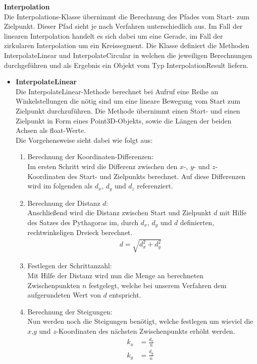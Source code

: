 \textbf{Interpolation}\\
Die Interpolations-Klasse übernimmt die Berechnung des Pfades vom Start- zum Zielpunkt. Dieser Pfad sieht je nach Verfahren unterschiedlich aus. Im Fall der linearen Interpolation handelt es sich dabei um eine Gerade, im Fall der zirkularen Interpolation um ein Kreissegment. Die Klasse definiert die Methoden InterpolateLinear und InterpolateCircular in welchen die jeweiligen Berechnungen durchgeführen und als Ergebnis ein Objekt vom Typ InterpolationResult liefern.
\begin{itemize}
\item \textbf{InterpolateLinear}\\
Die InterpolateLinear-Methode berechnet bei Aufruf eine Reihe an Winkelstellungen die nötig sind um eine lineare Bewegung vom Start zum Zielpunkt durchzuführen. Die Methode übernimmt einen Start- und einen Zielpunkt in Form eines Point3D-Objekts, sowie die Längen der beiden Achsen als float-Werte.\\
Die Vorgehensweise sieht dabei wie folgt aus:
\begin{enumerate}
\item Berechnung der Koordinaten-Differenzen:\\
Im ersten Schritt wird die Differenz zwischen den $x$-, $y$- und $z$-Koordinaten des Start- und Zielpunkts berechnet. Auf diese Differenzen wird im folgenden als $d_x$, $d_y$ und $d_z$ referenziert. 
\item Berechnung der Distanz $d$:\\
Anschließend wird die Distanz zwischen Start und Zielpunkt $d$ mit Hilfe des Satzes des Pythagoras im, durch $d_x$, $d_y$ und $d$ definierten, rechtwinkeligen Dreieck berechnet.
\begin{align*}
d = \sqrt{d_x^2+d_y^2}
\end{align*}
\item Festlegen der Schrittanzahl:\\
Mit Hilfe der Distanz wird nun die Menge an berechneten Zwischenpunkten $n$ festgelegt, welche bei unserem Verfahren dem aufgerundeten Wert von $d$ entspricht.
\item Berechnung der Steigungen:\\
Nun werden noch die Steigungen benötigt, welche festlegen um wieviel die $x$,$y$ und $z$-Koordinaten des nächsten Zwischenpunkts erhöht werden.
\begin{align*}
k_x & = \frac{d_x}{n}\\
k_y & = \frac{d_y}{n}\\

\end{align*}
\end{enumerate}
\end{itemize}
